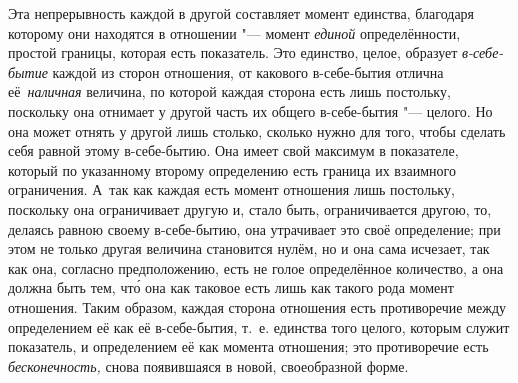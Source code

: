 Эта непрерывность каждой в другой составляет момент единства, благодаря
которому они находятся в отношении "--- момент {\em единой} определённости,
простой границы, которая есть показатель. Это единство, целое, образует
{\em в-себе-бытие} каждой из сторон отношения, от какового в-себе-бытия отлична
её~{\em наличная} величина, по которой каждая сторона есть лишь постольку,
поскольку она отнимает у другой часть их общего в-себе-бытия "--- целого. Но
она может отнять у другой лишь столько, сколько нужно для того, чтобы сделать
себя равной этому в-себе-бытию. Она имеет свой максимум в показателе, который
по указанному второму определению есть граница их взаимного ограничения. А~так
как каждая есть момент отношения лишь постольку, поскольку она ограничивает
другую и, стало быть, ограничивается другою, то, делаясь равною своему
в-себе-бытию, она утрачивает это своё определение; при этом не только другая
величина становится нулём, но и она сама
исчезает, так как она, согласно предположению, есть не голое определённое
количество, а она должна быть тем, чт\'{о} она как таковое есть лишь как
такого рода момент отношения. Таким образом, каждая сторона отношения есть
противоречие между определением её как её в-себе-бытия, т.~е. единства того
целого, которым служит показатель, и определением её как момента отношения; это
противоречие есть {\em бесконечность,} снова появившаяся в новой, своеобразной
форме.

